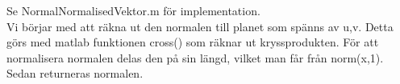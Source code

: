 Se NormalNormalisedVektor.m för implementation.\\
Vi börjar med att räkna ut den normalen till planet som spänns av u,v.
Detta görs med matlab funktionen cross() som räknar ut kryssprodukten.
För att normalisera normalen delas den på sin längd, vilket man får från norm(x,1).
Sedan returneras normalen.
